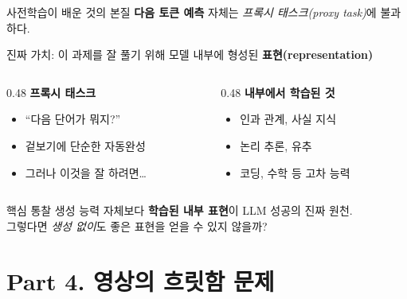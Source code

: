 \documentclass[aspectratio=169,10pt]{beamer}
\begin{document}
\begin{frame}{사전학습이 배운 것의 본질}
\textbf{다음 토큰 예측} 자체는 \emph{프록시 태스크(proxy task)}에 불과하다.

\vspace{0.4em}
진짜 가치: 이 과제를 잘 풀기 위해 모델 내부에 형성된 \alert{\textbf{표현(representation)}}

\vspace{0.6em}
\begin{columns}[T]
\begin{column}{0.48\textwidth}
\textbf{프록시 태스크}
\begin{itemize}
  \item ``다음 단어가 뭐지?''
  \item 겉보기에 단순한 자동완성
  \item 그러나 이것을 잘 하려면…
\end{itemize}
\end{column}
\begin{column}{0.48\textwidth}
\textbf{내부에서 학습된 것}
\begin{itemize}
  \item 인과 관계, 사실 지식
  \item 논리 추론, 유추
  \item 코딩, 수학 등 고차 능력
\end{itemize}
\end{column}
\end{columns}

\vspace{0.8em}
\begin{block}{핵심 통찰}
생성 능력 자체보다 \textbf{학습된 내부 표현}이 LLM 성공의 진짜 원천.\\
그렇다면 \emph{생성 없이}도 좋은 표현을 얻을 수 있지 않을까?
\end{block}
\end{frame}

\section{Part 4. 영상의 흐릿함 문제}
\end{document}
